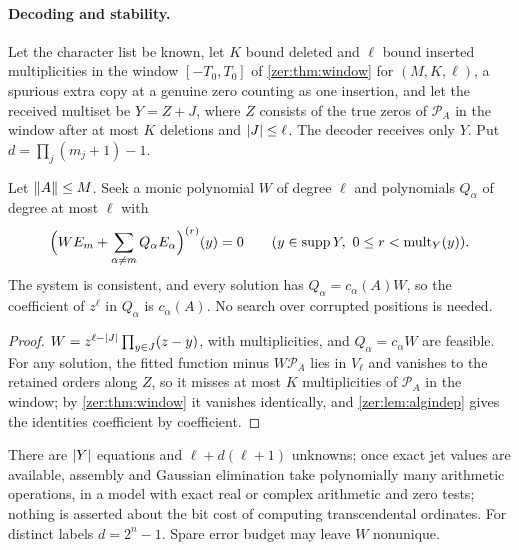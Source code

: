 \paragraph{Decoding and stability.}
Let the character list be known, let $K$ bound deleted and $\ell$ bound inserted multiplicities in the
window $[-T_0,T_0]$ of \cref{zer:thm:window} for $(M,K,\ell)$, a spurious extra copy at a genuine zero
counting as one insertion, and let the received multiset be $Y=Z+J$, where $Z$ consists of the true zeros
of $\mathcal P_A$ in the window after at most $K$ deletions and $\lvert J\rvert\le\ell$. The decoder receives only
$Y$. Put $d=\prod_j(m_j+1)-1$.

\begin{theorem}\label{zer:thm:decode}
Let $\lVert A\rVert\le M$. Seek a monic polynomial $W$ of degree $\ell$ and polynomials $Q_\alpha$ of degree at most
$\ell$ with
\[
 \Bigl(WE_m+\sum_{\alpha\ne m}Q_\alpha E_\alpha\Bigr)^{(r)}(y)=0\qquad(y\in\operatorname{supp} Y,\ 0\le r<\operatorname{mult}_Y(y)).
\]
The system is consistent, and every solution has $Q_\alpha=c_\alpha(A)W$, so the coefficient of $z^\ell$ in
$Q_\alpha$ is $c_\alpha(A)$. No search over corrupted positions is needed.
\end{theorem}
\begin{proof}
$W=z^{\ell-\lvert J\rvert}\prod_{y\in J}(z-y)$, with multiplicities, and $Q_\alpha=c_\alpha W$ are feasible. For any
solution, the fitted function minus $W\mathcal P_A$ lies in $V_\ell$ and vanishes to the retained orders along
$Z$, so it misses at most $K$ multiplicities of $\mathcal P_A$ in the window; by \cref{zer:thm:window} it
vanishes identically, and \cref{zer:lem:algindep} gives the identities coefficient by coefficient.
\end{proof}

There are $\lvert Y\rvert$ equations and $\ell+d(\ell+1)$ unknowns; once exact jet values are available, assembly
and Gaussian elimination take polynomially many arithmetic operations, in a model with exact real or
complex arithmetic and zero tests; nothing is asserted about the bit cost of computing transcendental
ordinates. For distinct labels $d=2^n-1$. Spare error budget may leave $W$ nonunique.


